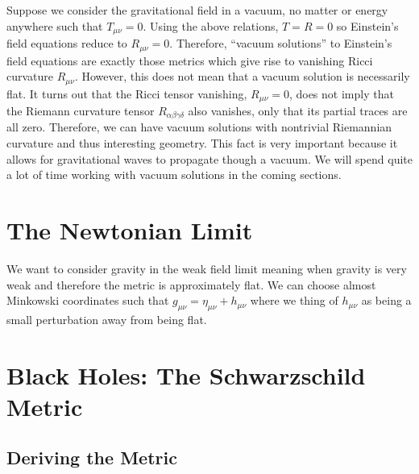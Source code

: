 \documentclass[11pt, a4paper]{article}
\begin{document}
Suppose we consider the gravitational field in a vacuum, no matter or energy anywhere such that $T_{\mu \nu} = 0$. Using the above relations, $T = R = 0$ so Einstein's field equations reduce to $R_{\mu \nu} = 0$. Therefore, ``vacuum solutions'' to Einstein's field equations are exactly those metrics which give rise to vanishing Ricci curvature $R_{\mu \nu}$. However, this does not mean that a vacuum solution is necessarily flat. It turns out that the Ricci tensor vanishing, $R_{\mu \nu} = 0$, does not imply that the Riemann curvature tensor $R_{\alpha \beta \gamma \delta}$ also vanishes, only that its partial traces are all zero. Therefore, we can have vacuum solutions with nontrivial Riemannian curvature and thus interesting geometry. This fact is very important because it allows for gravitational waves to propagate though a vacuum. We will spend quite a lot of time working with vacuum solutions in the coming sections. 

\section{The Newtonian Limit}

We want to consider gravity in the weak field limit meaning when gravity is very weak and therefore the metric is approximately flat. We can choose almost Minkowski coordinates such that $g_{\mu \nu} = \eta_{\mu \nu} + h_{\mu \nu}$ where we thing of $h_{\mu \nu}$ as being a small perturbation away from being flat.

\section{Black Holes: The Schwarzschild Metric}

\subsection{Deriving the Metric}
\end{document}
